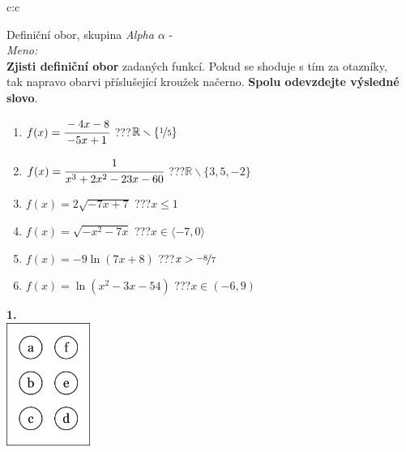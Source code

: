 \documentclass[10pt]{report}
\begin{document}
\thispagestyle{empty}
\begin{tabular}{c:c}
\begin{minipage}[c][99mm][t]{0.49\linewidth}
\begin{center}
\vspace{7mm}
{\huge Definiční obor, skupina \textit{Alpha $\alpha$} -}\\[4.5mm]
\textit{Meno:}\phantom{xxxxxxxxxxxxxxxxxxxxxxxxxxxxxxxxxxxxxxxxxxxxxxxxxxxxxxxxxxxxxxxxx}\\[3.5mm]
\textbf{Zjisti definiční obor} zadaných funkcí. Pokud se shoduje s tím za otazníky,\\tak napravo obarvi příslušející kroužek načerno. \textbf{Spolu odevzdejte výsledné slovo}.\\[3mm]
\begin{minipage}{0.77\linewidth}
\begin{center}
\begin{varwidth}{\textwidth}
\begin{enumerate}
\normalsize
\item $f(x)=\cfrac{-4x-8}{-5x+1}$\quad \dotfill\; ???\;\dotfill \quad $\mathbb{R}\smallsetminus\{\nicefrac{1}{5}\}$
\item $f(x)=\cfrac{1}{x^3+2x^2-23x-60}$\quad \dotfill\; ???\;\dotfill \quad $\mathbb{R}\smallsetminus\{3,5,-2\}$
\item $f(x)=2\sqrt{-7x+7}$\quad \dotfill\; ???\;\dotfill \quad $x\leq1$
\item $f(x)=\sqrt{-x^2-7x}$\quad \dotfill\; ???\;\dotfill \quad $x\in\langle-7 , 0\rangle$
\item $f(x)=-9\ln{(7x+8)}$\quad \dotfill\; ???\;\dotfill \quad $x>\nicefrac{-8}{7}$
\item $f(x)=\ln{(x^2-3x-54)}$\quad \dotfill\; ???\;\dotfill \quad $x\in(-6 , 9)$
\end{enumerate}
\end{varwidth}
\end{center}
\end{minipage}
\begin{minipage}{0.20\linewidth}
\begin{center}
{\Huge\bfseries 1.} \\[2mm]
\includegraphics[height=40mm]{../images/braille.png}

\end{center}
\end{minipage}
\end{center}
\end{minipage}
\end{tabular}
\end{document}
